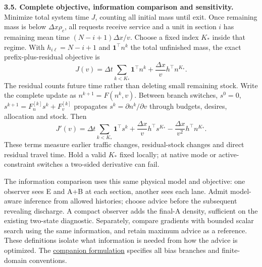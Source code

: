 \documentclass[11pt,a4paper]{article}
\begin{document}
\textbf{3.5. Complete objective, information comparison and sensitivity.}
Minimize total system time $J$, counting all initial mass until exit.
Once remaining mass is below
$\Delta x\rho_c$, all requests receive service and a unit in section $i$
has remaining mean time $(N-i+1)\Delta x/v$. Choose a fixed index $K_*$
inside that regime. With $h_{i\ell}=N-i+1$ and $\mathbf1^\top n^k$ the
total unfinished mass, the exact prefix-plus-residual objective is
\begin{equation}
 J(v)=\Delta t\sum_{k<K_*}\mathbf1^\top n^k
             +\frac{\Delta x}{v}h^\top n^{K_*}.\label{eq:objective}
\end{equation}
The residual counts future time rather than deleting small remaining stock.
Write the complete update as $n^{k+1}=F(n^k,v)$. Between branch switches,
$s^0=0$, $s^{k+1}=F_n^{[k]}s^k+F_v^{[k]}$ propagates
$s^k=\partial n^k/\partial v$ through budgets, desires, allocation and stock.
Then
\begin{equation}
 J'(v)=\Delta t\sum_{k<K_*}\mathbf1^\top s^k
       +\frac{\Delta x}{v}h^\top s^{K_*}
       -\frac{\Delta x}{v^2}h^\top n^{K_*}.\label{eq:sensitivity}
\end{equation}
These terms measure earlier traffic changes, residual-stock changes and
direct residual travel time. Hold a valid $K_*$ fixed locally; at native
mode or active-constraint switches a two-sided derivative can fail.

The information comparison uses this same physical model and objective:
one observer sees E and A+B at each section, another sees each lane.
Admit model-aware inference from allowed histories; choose advice before
the subsequent revealing discharge. A compact observer adds the final-A
density, sufficient on the existing two-state diagnostic. Separately,
compare gradients with bounded scalar search using the same information,
and retain maximum advice as a reference. These definitions isolate what
information is needed from how the advice is optimized.
The \href{vsl_joined_candidate_contract_and_qualification.pdf}{companion formulation}
specifies all bias branches and finite-domain conventions.
\end{document}
